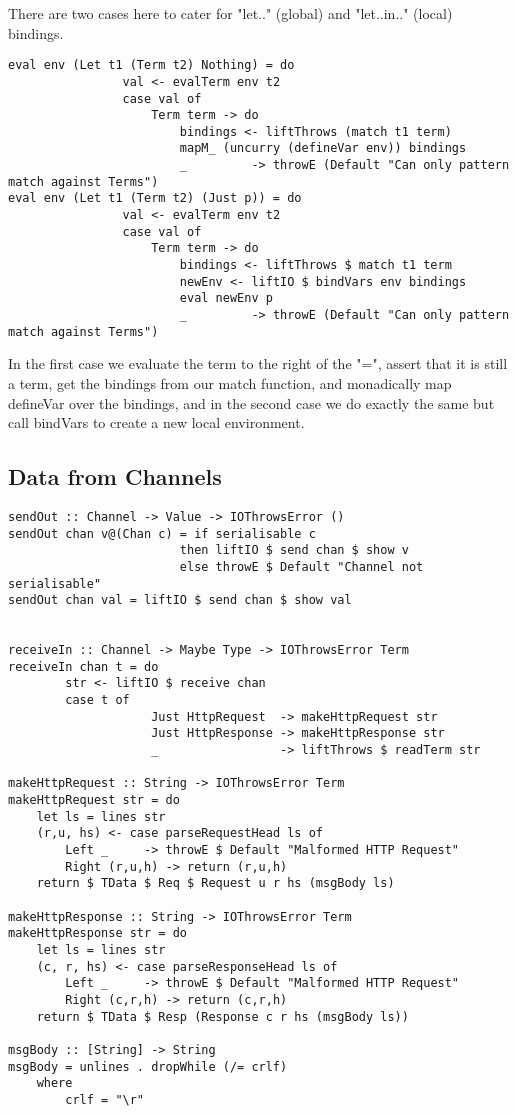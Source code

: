 There are two cases here to cater for "let.." (global) and "let..in.." (local) bindings.
\begin{verbatim}
eval env (Let t1 (Term t2) Nothing) = do 
                val <- evalTerm env t2 
                case val of 
                    Term term -> do
                        bindings <- liftThrows (match t1 term)
                        mapM_ (uncurry (defineVar env)) bindings
                        _         -> throwE (Default "Can only pattern match against Terms")
eval env (Let t1 (Term t2) (Just p)) = do
                val <- evalTerm env t2 
                case val of 
                    Term term -> do
                        bindings <- liftThrows $ match t1 term
                        newEnv <- liftIO $ bindVars env bindings
                        eval newEnv p
                        _         -> throwE (Default "Can only pattern match against Terms")
\end{verbatim}
In the first case we evaluate the term to the right of the "=", assert that it is still a term, get the bindings from our match function, and monadically map defineVar over the bindings, and in the second case we do exactly the same but call bindVars to create a new local environment.

\subsection{Data from Channels}
\label{sec:sendout}

\begin{verbatim}
sendOut :: Channel -> Value -> IOThrowsError () 
sendOut chan v@(Chan c) = if serialisable c
                        then liftIO $ send chan $ show v
                        else throwE $ Default "Channel not serialisable" 
sendOut chan val = liftIO $ send chan $ show val


receiveIn :: Channel -> Maybe Type -> IOThrowsError Term
receiveIn chan t = do
        str <- liftIO $ receive chan
        case t of
                    Just HttpRequest  -> makeHttpRequest str
                    Just HttpResponse -> makeHttpResponse str
                    _                 -> liftThrows $ readTerm str

makeHttpRequest :: String -> IOThrowsError Term
makeHttpRequest str = do
    let ls = lines str
    (r,u, hs) <- case parseRequestHead ls of
        Left _     -> throwE $ Default "Malformed HTTP Request"
        Right (r,u,h) -> return (r,u,h)
    return $ TData $ Req $ Request u r hs (msgBody ls)

makeHttpResponse :: String -> IOThrowsError Term
makeHttpResponse str = do
    let ls = lines str
    (c, r, hs) <- case parseResponseHead ls of
        Left _     -> throwE $ Default "Malformed HTTP Request"
        Right (c,r,h) -> return (c,r,h)
    return $ TData $ Resp (Response c r hs (msgBody ls))

msgBody :: [String] -> String
msgBody = unlines . dropWhile (/= crlf)
    where
        crlf = "\r"
\end{verbatim}


